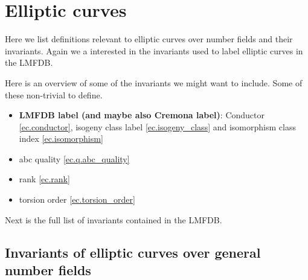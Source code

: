 


\chapter{Elliptic curves}
Here we list definitions relevant to elliptic curves over number fields and their invariants.
Again we a interested in the invariants used to label elliptic curves in the LMFDB.

Here is an overview of some of the invariants we might want to include. Some of these non-trivial to define.

\begin{itemize}
    \item \textbf{LMFDB label (and maybe also Cremona label)}: Conductor \ref{ec.conductor},
      isogeny class label \ref{ec.isogeny_class} and isomorphism class index \ref{ec.isomorphism}
    \item abc quality \ref{ec.q.abc_quality}
    \item rank \ref{ec.rank}
    \item torsion order \ref{ec.torsion_order}
\end{itemize}

Next is the full list of invariants contained in the LMFDB.



\section{Invariants of elliptic curves over general number fields}

